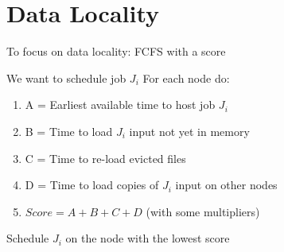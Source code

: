 \documentclass{libs/ufc_format}
\begin{document}
{\section{Data Locality}
\begin{frame}{To focus on data locality: FCFS with a score}
	\begin{block}{We want to schedule job $J_i$}
		For each node do:
		\begin{enumerate}
			\item A = Earliest available time to host job $J_i$
			\item B = Time to load $J_i$ input not yet in memory
			\item C = Time to re-load evicted files
			\item D = Time to load copies of $J_i$ input on other nodes
			\item $Score = A + B + C+ D$ (with some multipliers)
		\end{enumerate}
		Schedule $J_i$ on the node with the lowest score
	\end{block}
\end{frame}


}
\end{document}
